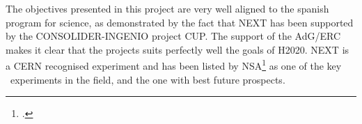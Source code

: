 The objectives presented in this project are very well aligned to the spanish program for science, as demonstrated by the fact that NEXT has been supported by the CONSOLIDER-INGENIO project CUP. The support of the AdG/ERC makes it clear that the projects suits perfectly well the goals of H2020. NEXT is a CERN recognised experiment and has been listed by NSA\footcite{NLDBD} as one of the key \bbonu\ experiments in the field, and the one with best future prospects.




